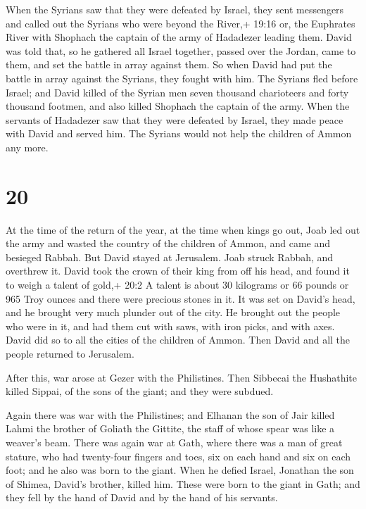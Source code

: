  When the Syrians saw that they were defeated by Israel,
they sent messengers and called out the Syrians who were beyond the
River,+ 19:16 or, the Euphrates River with Shophach the captain of the
army of Hadadezer leading them.  David was told that, so he
gathered all Israel together, passed over the Jordan, came to them, and
set the battle in array against them. So when David had put the battle
in array against the Syrians, they fought with him.  The
Syrians fled before Israel; and David killed of the Syrian men seven
thousand charioteers and forty thousand footmen, and also killed
Shophach the captain of the army.  When the servants of
Hadadezer saw that they were defeated by Israel, they made peace with
David and served him. The Syrians would not help the children of Ammon
any more.

\hypertarget{section-19}{%
\section{20}\label{section-19}}

 At the time of the return of the year, at the time when
kings go out, Joab led out the army and wasted the country of the
children of Ammon, and came and besieged Rabbah. But David stayed at
Jerusalem. Joab struck Rabbah, and overthrew it.  David took
the crown of their king from off his head, and found it to weigh a
talent of gold,+ 20:2 A talent is about 30 kilograms or 66 pounds or 965
Troy ounces and there were precious stones in it. It was set on David's
head, and he brought very much plunder out of the city.  He
brought out the people who were in it, and had them cut with saws, with
iron picks, and with axes. David did so to all the cities of the
children of Ammon. Then David and all the people returned to Jerusalem.

 After this, war arose at Gezer with the Philistines. Then
Sibbecai the Hushathite killed Sippai, of the sons of the giant; and
they were subdued.

 Again there was war with the Philistines; and Elhanan the
son of Jair killed Lahmi the brother of Goliath the Gittite, the staff
of whose spear was like a weaver's beam.  There was again
war at Gath, where there was a man of great stature, who had twenty-four
fingers and toes, six on each hand and six on each foot; and he also was
born to the giant.  When he defied Israel, Jonathan the son
of Shimea, David's brother, killed him.  These were born to
the giant in Gath; and they fell by the hand of David and by the hand of
his servants.

